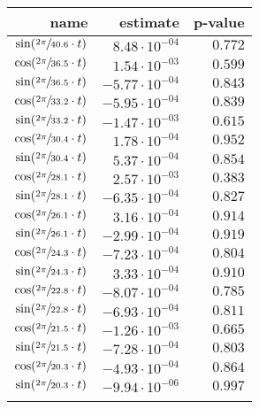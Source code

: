 \begin{tabular}{r|rr}
\hline
 name                               & estimate               & p-value   \\
\hline
 $\sin(\sfrac{2\pi}{40.6} \cdot t)$ & $8.48 \cdot 10^{-04}$  & $0.772$   \\
 $\cos(\sfrac{2\pi}{36.5} \cdot t)$ & $1.54 \cdot 10^{-03}$  & $0.599$   \\
 $\sin(\sfrac{2\pi}{36.5} \cdot t)$ & $-5.77 \cdot 10^{-04}$ & $0.843$   \\
 $\cos(\sfrac{2\pi}{33.2} \cdot t)$ & $-5.95 \cdot 10^{-04}$ & $0.839$   \\
 $\sin(\sfrac{2\pi}{33.2} \cdot t)$ & $-1.47 \cdot 10^{-03}$ & $0.615$   \\
 $\cos(\sfrac{2\pi}{30.4} \cdot t)$ & $1.78 \cdot 10^{-04}$  & $0.952$   \\
 $\sin(\sfrac{2\pi}{30.4} \cdot t)$ & $5.37 \cdot 10^{-04}$  & $0.854$   \\
 $\cos(\sfrac{2\pi}{28.1} \cdot t)$ & $2.57 \cdot 10^{-03}$  & $0.383$   \\
 $\sin(\sfrac{2\pi}{28.1} \cdot t)$ & $-6.35 \cdot 10^{-04}$ & $0.827$   \\
 $\cos(\sfrac{2\pi}{26.1} \cdot t)$ & $3.16 \cdot 10^{-04}$  & $0.914$   \\
 $\sin(\sfrac{2\pi}{26.1} \cdot t)$ & $-2.99 \cdot 10^{-04}$ & $0.919$   \\
 $\cos(\sfrac{2\pi}{24.3} \cdot t)$ & $-7.23 \cdot 10^{-04}$ & $0.804$   \\
 $\sin(\sfrac{2\pi}{24.3} \cdot t)$ & $3.33 \cdot 10^{-04}$  & $0.910$   \\
 $\cos(\sfrac{2\pi}{22.8} \cdot t)$ & $-8.07 \cdot 10^{-04}$ & $0.785$   \\
 $\sin(\sfrac{2\pi}{22.8} \cdot t)$ & $-6.93 \cdot 10^{-04}$ & $0.811$   \\
 $\cos(\sfrac{2\pi}{21.5} \cdot t)$ & $-1.26 \cdot 10^{-03}$ & $0.665$   \\
 $\sin(\sfrac{2\pi}{21.5} \cdot t)$ & $-7.28 \cdot 10^{-04}$ & $0.803$   \\
 $\cos(\sfrac{2\pi}{20.3} \cdot t)$ & $-4.93 \cdot 10^{-04}$ & $0.864$   \\
 $\sin(\sfrac{2\pi}{20.3} \cdot t)$ & $-9.94 \cdot 10^{-06}$ & $0.997$   \\
                                    &                        &           \\
\hline
\end{tabular}